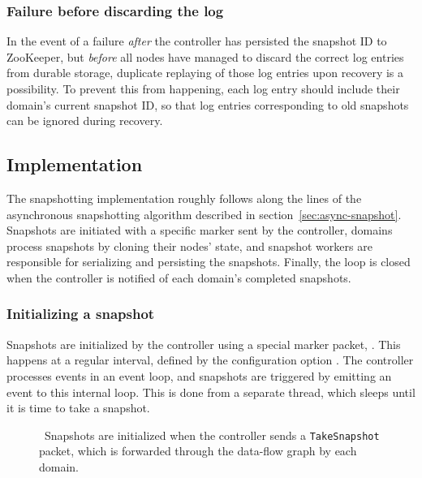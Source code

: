 \subsubsection{Failure before discarding the log}

In the event of a failure \textit{after} the controller has persisted the
snapshot ID to ZooKeeper, but \textit{before} all nodes have managed to discard
the correct log entries from durable storage, duplicate replaying of those log
entries upon recovery is a possibility. To prevent this from happening, each log
entry should include their domain's current snapshot ID, so that log entries
corresponding to old snapshots can be ignored during recovery.

\subsection{Implementation}

The snapshotting implementation roughly follows along the lines of the
asynchronous snapshotting algorithm described in
section~\ref{sec:async-snapshot}. Snapshots are initiated with a specific marker
sent by the controller, domains process snapshots by cloning their nodes' state,
and snapshot workers are responsible for serializing and persisting the
snapshots. Finally, the loop is closed when the controller is notified of each
domain's completed snapshots.

\subsubsection{Initializing a snapshot}

Snapshots are initialized by the controller using a special marker packet,
. This happens at a regular interval, defined by the
configuration option . The controller processes events
in an event loop, and snapshots are triggered by emitting an event to this
internal loop. This is done from a separate thread, which sleeps until it is
time to take a snapshot.

\begin{figure}[H]
  \begin{center}
    
    \caption{\
      Snapshots are initialized when the controller sends a
      \texttt{TakeSnapshot} packet, which is forwarded through the data-flow
      graph by each domain.
    }\label{fig:take-snapshot}
  \end{center}
\end{figure}

